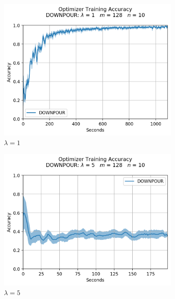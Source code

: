 \begin{figure}[H]
  \centering
  \begin{subfigure}{.49\textwidth}
    \centering
    \includegraphics[width=\linewidth]{resources/images/downpour_10}
    \caption{$\lambda = 1$}
  \end{subfigure}
  \begin{subfigure}{.49\textwidth}
    \centering
    \includegraphics[width=\linewidth]{resources/images/downpour_accumulated_5}
    \caption{$\lambda = 5$}
  \end{subfigure}
   \begin{subfigure}{.49\textwidth}
    \centering

\end{subfigure}
\end{figure}
